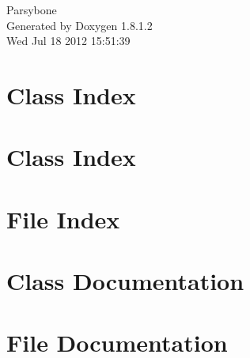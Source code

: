 \documentclass{book}
\begin{document}
\hypersetup{pageanchor=false,citecolor=blue}
\begin{titlepage}
\vspace*{7cm}
\begin{center}
{\Large Parsybone }\\
\vspace*{1cm}
{\large Generated by Doxygen 1.8.1.2}\\
\vspace*{0.5cm}
{\small Wed Jul 18 2012 15:51:39}\\
\end{center}
\end{titlepage}
\clearemptydoublepage
{}
\tableofcontents
\clearemptydoublepage
{}
\hypersetup{pageanchor=true,citecolor=blue}
\chapter{Class Index}

\chapter{Class Index}

\chapter{File Index}

\chapter{Class Documentation}







































\chapter{File Documentation}




\printindex
\end{document}
